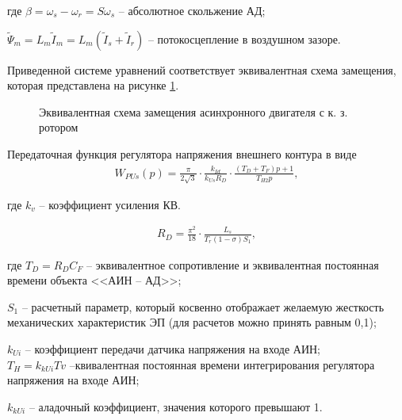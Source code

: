         где $\beta = \omega_s - \omega_r = S\omega_s$ -- абсолютное скольжение АД;\par
        $\tilde \Psi_m = L_m \tilde I_m = L_m(\tilde I_s + \tilde I_r)$ -- потокосцепление
        в воздушном зазоре.

        Приведенной системе уравнений соответствует эквивалентная схема
        замещения, которая представлена на рисунке \ref{fig:ad-zam}.  

        \begin{figure}[h!]
            \caption{Эквивалентная схема замещения асинхронного двигателя с к. з. ротором}
            \label{fig:ad-zam}
        \end{figure}

        Передаточная функция регулятора напряжения внешнего контура в виде
        \begin{gather*}
            W_{PUs}(p)=\frac{\pi}{2\sqrt{3}}\cdot\frac{k_{Id}}{k_{Us}R_D} \cdot
                \frac{(T_D + T_F) p+1}{T_{H2}p},
        \end{gather*}

        где $k_v$ -- коэффициент усиления КВ.

        \begin{gather*}
            R_D = \frac{\pi^2}{18} \cdot \frac{L_s}{T_r(1 - \sigma)S_1},
        \end{gather*}

        где $T_D=R_D C_F$ -- эквивалентное сопротивление и эквивалентная
        постоянная времени объекта <<АИН -- АД>>;\par
        $S_1$ -- расчетный параметр,
        который косвенно отображает желаемую жесткость механических
        характеристик ЭП (для расчетов можно принять равным 0,1);\par
        $k_{Ui}$ -- коэффициент передачи датчика напряжения на входе АИН; \\
        $T_H = k_{kUi}Tv$ --квивалентная постоянная времени интегрирования
            регулятора напряжения на входе АИН;\par
        $k_{kUi}$ -- аладочный коэффициент, значения которого превышают 1. 

